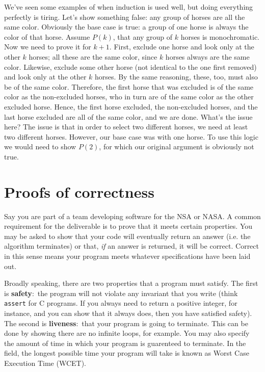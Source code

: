 \documentclass[nobib]{tufte-handout}
\newcommand{\defn}[2]{\noindent\textbf{#1}:\ #2}
\begin{document}
We've seen some examples of when induction is used well, but doing everything 
perfectly is tiring. Let's show something false: any group of horses are 
all the same color. Obviously the base case is true: a group of one horse 
is always the color of that horse. Assume $P(k)$, that any group of $k$ horses 
is monochromatic. Now we need to prove it for $k+1$. First, exclude one horse and 
look only at the other $k$ horses; all these are the same color, since $k$ horses 
always are the same color. Likewise, exclude some other horse (not identical to 
the one first removed) and look only at the other $k$ horses. By the same reasoning, 
these, too, must also be of the same color. Therefore, the first horse that 
was excluded is of the same color as the non-excluded horses, who in turn are 
of the same color as the other excluded horse. Hence, the first horse excluded, 
the non-excluded horses, and the last horse excluded are all of the same color, 
and we are done. What's the issue here? The issue is that in order to select two different 
horses, we need at least two different horses. However, our base case was with one horse. 
To use this logic we would need to show $P(2)$, for which our original argument is
obviously not true. 

\pagebreak 

\section{Proofs of correctness}

Say you are part of a team developing software for the NSA or NASA. 
A common requirement for the deliverable is to prove that it meets 
certain properties. You may be asked to show that your code 
will eventually return an answer (i.e. the algorithm terminates)
or that, \emph{if} an answer is returned, it will be correct. 
Correct in this sense means your program meets whatever specifications 
have been laid out. 

Broadly speaking, there are two properties that a program must 
satisfy. The first is 
\defn{safety}{the program will not violate any invariant that you write 
(think \texttt{assert} for C programs. If you always need to return 
a positive integer, for instance, and you can show that it always does, 
then you have satisfied safety)}. The second is 
\defn{liveness}{that your program is going to terminate}. This can be 
done by showing there are no infinite loops, for example. You may also specify
the amount of time in which your program is guarenteed to terminate. 
In the field, the longest possible time your program will take 
is known as Worst Case Execution Time (WCET).
\end{document}
